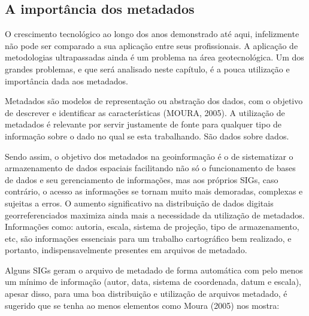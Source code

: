 		\subsection{A importância dos metadados}
		
		O crescimento tecnológico ao longo dos anos demonstrado até aqui, infelizmente não pode ser comparado a sua aplicação entre seus profissionais. A aplicação de metodologias ultrapassadas ainda é um problema na área geotecnológica. Um dos grandes problemas, e que será analisado neste capítulo, é a pouca utilização e importância dada aos metadados.
		
		Metadados são modelos de representação ou abstração dos dados, com o objetivo de descrever e identificar as características (MOURA, 2005)\cite{MOURA}. A utilização de metadados é relevante por servir justamente de fonte para qualquer tipo de informação sobre o dado no qual se esta trabalhando. São dados sobre dados.
		
		Sendo assim, o objetivo dos metadados na geoinformação é o de sistematizar o armazenamento de dados espaciais facilitando não só o funcionamento de bases de dados e seu gerenciamento de informações, mas aos próprios SIGs, caso contrário, o acesso as informações se tornam muito mais demoradas, complexas e sujeitas a erros. O aumento significativo na distribuição de dados digitais georreferenciados maximiza ainda mais a necessidade da utilização de metadados. Informações como: autoria, escala, sistema de projeção, tipo de armazenamento, etc, são informações essenciais para um trabalho cartográfico bem realizado, e portanto, indispensavelmente presentes em arquivos de metadado.
		
		Alguns SIGs geram o arquivo de metadado de forma automática com pelo menos um mínimo de informação (autor, data, sistema de coordenada, datum e escala), apesar disso, para uma boa distribuição e utilização de arquivos metadado, é sugerido que se tenha ao menos elementos como Moura (2005)\cite{MOURA} nos mostra:
		
